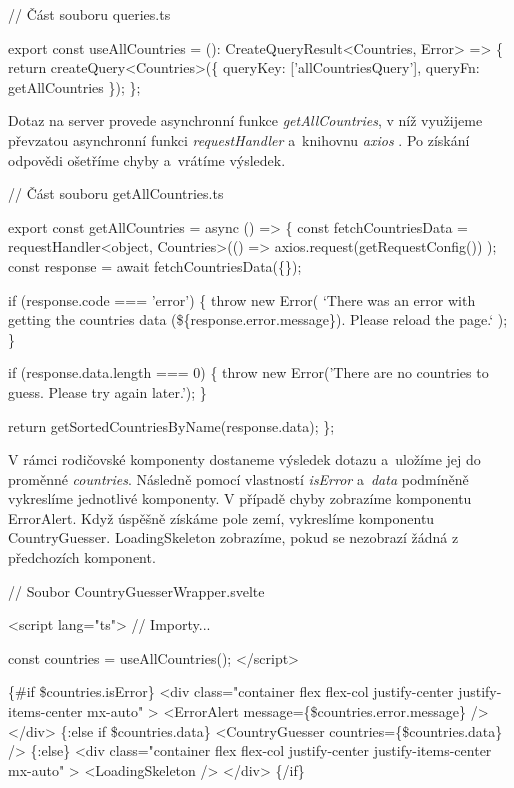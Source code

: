 \begin{prog}
// Část souboru queries.ts

export const useAllCountries = (): CreateQueryResult<Countries, Error> => \{
  return createQuery<Countries>(\{
    queryKey: ['allCountriesQuery'], queryFn: getAllCountries
  \});
\};
\end{prog}

Dotaz na server provede asynchronní funkce \emph{getAllCountries}, v níž využijeme převzatou asynchronní funkci \emph{requestHandler} \cite{axiosrequesthandler} a~knihovnu \emph{axios} \cite{axioslib}. 
Po získání odpovědi ošetříme chyby a~vrátíme výsledek.

\begin{prog}
// Část souboru getAllCountries.ts

export const getAllCountries = async () => \{
  const fetchCountriesData = requestHandler<object, Countries>(() =>
    axios.request(getRequestConfig())
  );
  const response = await fetchCountriesData(\{\});

  if (response.code === 'error') \{
    throw new Error(
      `There was an error with getting the countries data 
      (\$\{response.error.message\}). Please reload the page.`
    );
  \}

  if (response.data.length === 0) \{
    throw new Error('There are no countries to guess. Please try again later.');
  \}

  return getSortedCountriesByName(response.data);
\};
\end{prog}

V rámci rodičovské komponenty dostaneme výsledek dotazu a~uložíme jej do proměnné \emph{countries}. Následně pomocí vlastností \emph{isError} a~\emph{data} podmíněně vykreslíme jednotlivé komponenty. 
V případě chyby zobrazíme komponentu ErrorAlert. Když úspěšně získáme pole zemí, vykreslíme komponentu CountryGuesser. LoadingSkeleton zobrazíme, pokud se nezobrazí žádná z předchozích komponent.

\begin{prog}
// Soubor CountryGuesserWrapper.svelte

<script lang="ts">
  // Importy...

  const countries = useAllCountries();
</script>

\{#if \$countries.isError\}
  <div 
    class="container flex flex-col justify-center justify-items-center mx-auto"
  >
    <ErrorAlert message=\{\$countries.error.message\} />
  </div>
\{:else if \$countries.data\}
  <CountryGuesser countries=\{\$countries.data\} />
\{:else\}
  <div 
    class="container flex flex-col justify-center justify-items-center mx-auto"
  >
    <LoadingSkeleton />
  </div>
\{/if\}
\end{prog}

